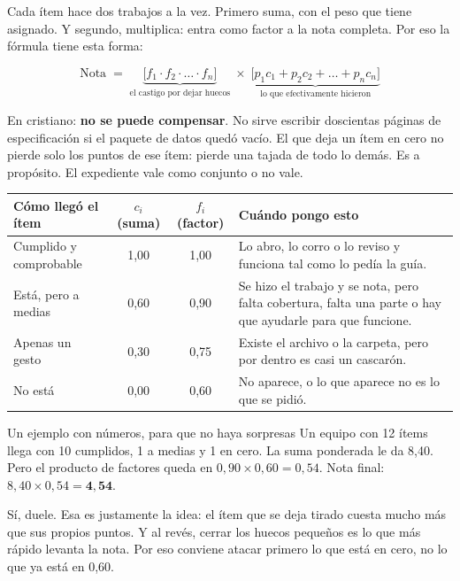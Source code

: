 \documentclass[11pt,a4paper]{article}
\begin{document}
Cada ítem hace dos trabajos a la vez. Primero suma, con el peso que tiene asignado. Y segundo, multiplica: entra como factor a la nota completa. Por eso la fórmula tiene esta forma:

\begin{equation*}
\text{Nota} \;=\; \underbrace{\big[f_1 \cdot f_2 \cdot \ldots \cdot f_n\big]}_{\text{el castigo por dejar huecos}} \;\times\; \underbrace{\big[p_1c_1 + p_2c_2 + \ldots + p_nc_n\big]}_{\text{lo que efectivamente hicieron}}
\end{equation*}

En cristiano: \textbf{no se puede compensar}. No sirve escribir doscientas páginas de especificación si el paquete de datos quedó vacío. El que deja un ítem en cero no pierde solo los puntos de ese ítem: pierde una tajada de todo lo demás. Es a propósito. El expediente vale como conjunto o no vale.

\begin{center}
\small
\begin{tabular}{@{}p{5.6cm}cc>{\raggedright\arraybackslash}p{5.6cm}@{}}
\toprule
\textbf{Cómo llegó el ítem} & \textbf{$c_i$ (suma)} & \textbf{$f_i$ (factor)} & \textbf{Cuándo pongo esto}\\
\midrule
Cumplido y comprobable & 1,00 & 1,00 & Lo abro, lo corro o lo reviso y funciona tal como lo pedía la guía.\\
\addlinespace
Está, pero a medias & 0,60 & 0,90 & Se hizo el trabajo y se nota, pero falta cobertura, falta una parte o hay que ayudarle para que funcione.\\
\addlinespace
Apenas un gesto & 0,30 & 0,75 & Existe el archivo o la carpeta, pero por dentro es casi un cascarón.\\
\addlinespace
No está & 0,00 & 0,60 & No aparece, o lo que aparece no es lo que se pidió.\\
\bottomrule
\end{tabular}
\end{center}

\vspace{6pt}
\begin{cajaazul}{Un ejemplo con números, para que no haya sorpresas}
Un equipo con 12 ítems llega con 10 cumplidos, 1 a medias y 1 en cero. La suma ponderada le da 8,40. Pero el producto de factores queda en $0{,}90 \times 0{,}60 = 0{,}54$. Nota final: $8{,}40 \times 0{,}54 = \mathbf{4{,}54}$.

Sí, duele. Esa es justamente la idea: el ítem que se deja tirado cuesta mucho más que sus propios puntos. Y al revés, cerrar los huecos pequeños es lo que más rápido levanta la nota. Por eso conviene atacar primero lo que está en cero, no lo que ya está en 0,60.
\end{cajaazul}
\end{document}
